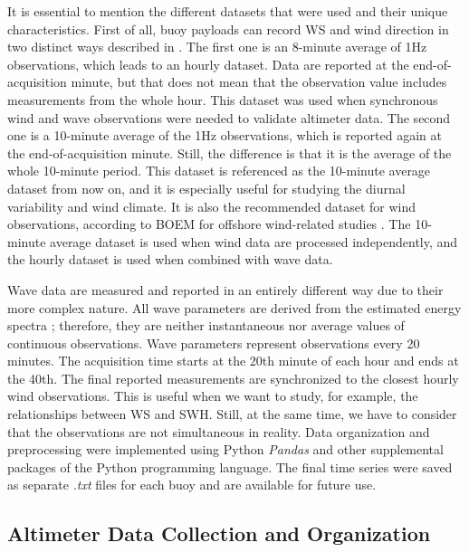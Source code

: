 It is essential to mention the different datasets that were used and their unique characteristics. First of all, buoy payloads can record WS and wind direction in two distinct ways described in \cite{Data2009}. The first one is an 8-minute average of 1Hz observations, which leads to an hourly dataset. Data are reported at the end-of-acquisition minute, but that does not mean that the observation value includes measurements from the whole hour. This dataset was used when synchronous wind and wave observations were needed to validate altimeter data. The second one is a 10-minute average of the 1Hz observations, which is reported again at the end-of-acquisition minute. Still, the difference is that it is the average of the whole 10-minute period. This dataset is referenced as the 10-minute average dataset from now on, and it is especially useful for studying the diurnal variability and wind climate. It is also the recommended dataset for wind observations, according to BOEM for offshore wind-related studies \cite{DNVGL2018}. The 10-minute average dataset is used when wind data are processed independently, and the hourly dataset is used when combined with wave data.



Wave data are measured and reported in an entirely different way due to their more complex nature. All wave parameters are derived from the estimated energy spectra \cite{Data2009}; therefore, they are neither instantaneous nor average values of continuous observations. Wave parameters represent observations every 20 minutes. The acquisition time starts at the 20th minute of each hour and ends at the 40th. The final reported measurements are synchronized to the closest hourly wind observations. This is useful when we want to study, for example, the relationships between WS and SWH. Still, at the same time, we have to consider that the observations are not simultaneous in reality.
Data organization and preprocessing were implemented using Python \emph{Pandas} and other supplemental packages of the Python programming language. The final time series were saved as separate \emph{.txt} files for each buoy and are available for future use.




\subsection{Altimeter Data Collection and Organization}\label{altimeter_data}


